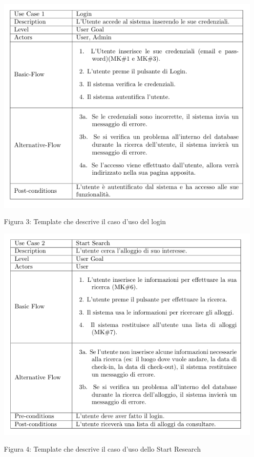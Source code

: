 \documentclass[10pt]{article}
\begin{document}
\begin{center}
\includegraphics[scale=0.6]{templates/tabella1}
\par\medskip
Figura 3: Template che descrive il caso d'uso del login
\par\medskip
\includegraphics[scale=0.65]{templates/tabella2}
\par\medskip
Figura 4: Template che descrive il caso d'uso dello Start Research
\par\medskip

\end{center}
\end{document}
